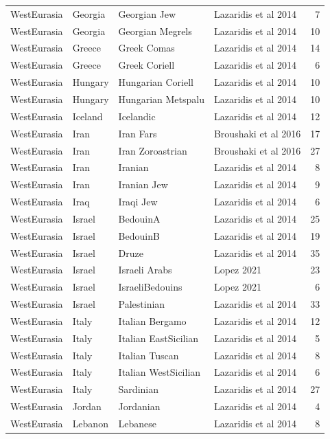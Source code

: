 \begin{longtable}[t]{lll>{\raggedright\arraybackslash}p{9em}r}
WestEurasia & Georgia & Georgian Jew & Lazaridis et al 2014 & 7\\
WestEurasia & Georgia & Georgian Megrels & Lazaridis et al 2014 & 10\\
WestEurasia & Greece & Greek Comas & Lazaridis et al 2014 & 14\\
WestEurasia & Greece & Greek Coriell & Lazaridis et al 2014 & 6\\
WestEurasia & Hungary & Hungarian Coriell & Lazaridis et al 2014 & 10\\
WestEurasia & Hungary & Hungarian Metspalu & Lazaridis et al 2014 & 10\\
WestEurasia & Iceland & Icelandic & Lazaridis et al 2014 & 12\\
WestEurasia & Iran & Iran Fars & Broushaki et al 2016 & 17\\
WestEurasia & Iran & Iran Zoroastrian & Broushaki et al 2016 & 27\\
WestEurasia & Iran & Iranian & Lazaridis et al 2014 & 8\\
WestEurasia & Iran & Iranian Jew & Lazaridis et al 2014 & 9\\
WestEurasia & Iraq & Iraqi Jew & Lazaridis et al 2014 & 6\\
WestEurasia & Israel & BedouinA & Lazaridis et al 2014 & 25\\
WestEurasia & Israel & BedouinB & Lazaridis et al 2014 & 19\\
WestEurasia & Israel & Druze & Lazaridis et al 2014 & 35\\
WestEurasia & Israel & Israeli Arabs & Lopez 2021 & 23\\
WestEurasia & Israel & IsraeliBedouins & Lopez 2021 & 6\\
WestEurasia & Israel & Palestinian & Lazaridis et al 2014 & 33\\
WestEurasia & Italy & Italian Bergamo & Lazaridis et al 2014 & 12\\
WestEurasia & Italy & Italian EastSicilian & Lazaridis et al 2014 & 5\\
WestEurasia & Italy & Italian Tuscan & Lazaridis et al 2014 & 8\\
WestEurasia & Italy & Italian WestSicilian & Lazaridis et al 2014 & 6\\
WestEurasia & Italy & Sardinian & Lazaridis et al 2014 & 27\\
WestEurasia & Jordan & Jordanian & Lazaridis et al 2014 & 4\\
WestEurasia & Lebanon & Lebanese & Lazaridis et al 2014 & 8\\

\end{longtable}
